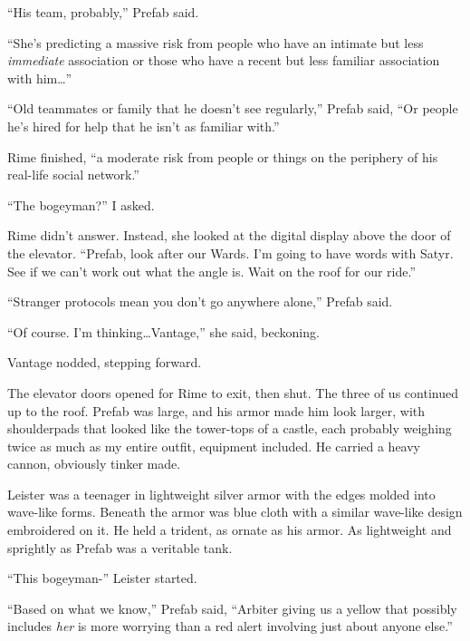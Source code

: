``His team, probably,'' Prefab said.



``She's predicting a massive risk from people who have an intimate but less \emph{immediate} association or those who have a recent but less familiar association with him\ldots''



``Old teammates or family that he doesn't see regularly,'' Prefab said, ``Or people he's hired for help that he isn't as familiar with.''



Rime finished, ``\ldotsAnd a moderate risk from people or things on the periphery of his real-life social network.''



``The bogeyman?'' I asked.



Rime didn't answer.  Instead, she looked at the digital display above the door of the elevator.  ``Prefab, look after our Wards.  I'm going to have words with Satyr.  See if we can't work out what the angle is.  Wait on the roof for our ride.''



``Stranger protocols mean you don't go anywhere alone,'' Prefab said.



``Of course.  I'm thinking\ldots  Vantage,'' she said, beckoning.



Vantage nodded, stepping forward.



The elevator doors opened for Rime to exit, then shut.  The three of us continued up to the roof.  Prefab was large, and his armor made him look larger, with shoulderpads that looked like the tower-tops of a castle, each probably weighing twice as much as my entire outfit, equipment included.  He carried a heavy cannon, obviously tinker made.



Leister was a teenager in lightweight silver armor with the edges molded into wave-like forms.  Beneath the armor was blue cloth with a similar wave-like design embroidered on it.  He held a trident, as ornate as his armor.  As lightweight and sprightly as Prefab was a veritable tank.



``This bogeyman-'' Leister started.



``Based on what we know,'' Prefab said, ``Arbiter giving us a yellow that possibly includes \emph{her} is more worrying than a red alert involving just about anyone else.''



